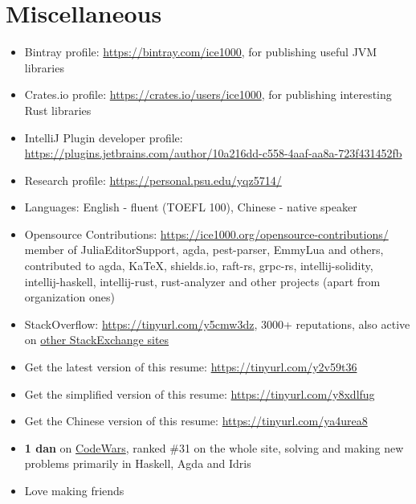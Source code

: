 \documentclass{resume}
\begin{document}

\section{Miscellaneous}
\begin{itemize}
  \item Bintray profile: \url{https://bintray.com/ice1000}, for publishing useful JVM libraries
  \item Crates.io profile: \url{https://crates.io/users/ice1000}, for publishing interesting Rust libraries
  \item IntelliJ Plugin developer profile:
    \url{https://plugins.jetbrains.com/author/10a216dd-c558-4aaf-aa8a-723f431452fb}
  \item Research profile: \url{https://personal.psu.edu/yqz5714/}
  \item Languages: English - fluent (TOEFL 100), Chinese - native speaker
  \item Opensource Contributions: \url{https://ice1000.org/opensource-contributions/} \\
    member of \textsf{JuliaEditorSupport}, \textsf{agda}, \textsf{pest-parser}, \textsf{EmmyLua} and others,
    contributed to \textsf{agda, KaTeX, shields.io, raft-rs, grpc-rs, intellij-solidity, intellij-haskell,
    intellij-rust, rust-analyzer}
    and other projects
    (apart from organization ones)
  \item StackOverflow: \url{https://tinyurl.com/y5cmw3dz},
    3000+ reputations, also active on \href{https://stackexchange.com/users/9532102/} {other StackExchange sites}
  \item Get the latest version of this resume: \url{https://tinyurl.com/y2v59t36}
  \item Get the simplified version of this resume: \url{https://tinyurl.com/y8xdlfug}
  \item Get the Chinese version of this resume: \url{https://tinyurl.com/ya4urea8}
  \item \textbf{1 dan} on
    \href{https://www.codewars.com/users/ice1000} {CodeWars},
    ranked \#31 on the whole site,
    solving and making new problems primarily in Haskell, Agda and Idris
  \item Love making friends
\end{itemize}

%
%
\end{document}
